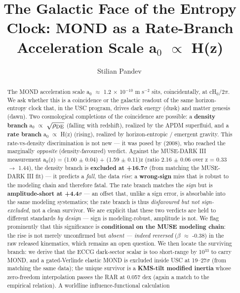 \documentclass[aps,prd,preprint,nofootinbib,superscriptaddress]{revtex4-2}
\begin{document}
\title{The Galactic Face of the Entropy Clock: MOND as a Rate-Branch
Acceleration Scale a\(_{0}\) \(\propto\) H(z)}

\author{Stilian Pandev\,}

\begin{abstract}
The MOND acceleration scale a\(_{0}\) \(\approx\) 1.2 × 10\(^{-10}\) m
s\(^{-2}\) sits, coincidentally, at cH\(_{0}\)/2\(\pi\). We ask whether
this is a coincidence or the galactic readout of the same
horizon-entropy clock that, in the USC program, drives dark energy
(dusk) and matter genesis (dawn). Two cosmological completions of the
coincidence are possible: a \textbf{density branch} a\(_{0}\)
\(\propto\) \(\sqrt{\rho_{\rm DE}}\) (falling with redshift), realized
by the APDM superfluid, and a \textbf{rate branch} a\(_{0}\) \(\propto\)
H(z) (rising), realized by horizon-entropic / emergent gravity. This
rate-vs-density discrimination is not new --- it was posed by
\citep{Limbach:2008aa} (2008), who reached the marginally
\emph{opposite} (density-favoured) verdict. Against the MUSE-DARK III
measurement a\(_{0}\)(z) = (1.00 \(\pm\) 0.04) + (1.59 \(\pm\) 0.11)z
(ratio 2.16 \(\pm\) 0.06 over z = 0.33 \(\to\) 1.44), the density branch
is \textbf{excluded at +16.7\(\sigma\)} (from matching the MUSE-DARK III
fit) --- it predicts a \emph{fall}, the data \emph{rise}: a
\textbf{wrong-sign} miss that is robust to the modeling chain and
therefore fatal. The rate branch matches the \emph{sign} but is
\textbf{amplitude-short at +4.4\(\sigma\)} --- an offset that, unlike a
sign error, is absorbable into the same modeling systematics; the rate
branch is thus \emph{disfavoured but not sign-excluded}, not a clean
survivor. We are explicit that these two verdicts are held to different
standards \emph{by design} --- sign is modeling-robust, amplitude is
not. We flag prominently that this significance is \textbf{conditional
on the MUSE modeling chain}: the rise is not merely unconfirmed but
\emph{absent --- indeed reversed} (\(\beta\) \(\approx\) -0.38) in the
raw released kinematics, which remains an open question. We then locate
the surviving branch: we derive that the ECCG dark-sector scalar is too
short-range by 10\(^{33}\) to carry MOND, and a gated-Verlinde elastic
MOND is excluded inside USC at 19--27\(\sigma\) (from matching the same
data); the unique survivor is a \textbf{KMS-tilt modified inertia} whose
zero-freedom interpolation passes the RAR at 0.057 dex (again a match to
the empirical relation). A worldline influence-functional calculation

\end{abstract}
\end{document}
